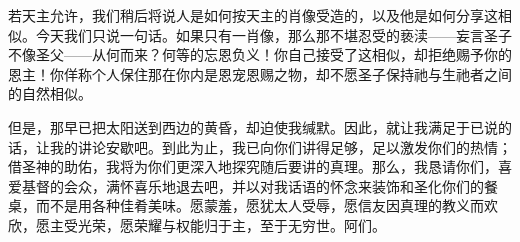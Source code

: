 若天主允许，我们稍后将说人是如何按天主的肖像受造的，以及他是如何分享这相似。今天我们只说一句话。如果只有一肖像，那么那不堪忍受的亵渎——妄言圣子不像圣父——从何而来？何等的忘恩负义！你自己接受了这相似，却拒绝赐予你的恩主！你佯称个人保住那在你内是恩宠恩赐之物，却不愿圣子保持祂与生祂者之间的自然相似。\par

但是，那早已把太阳送到西边的黄昏，却迫使我缄默。因此，就让我满足于已说的话，让我的讲论安歇吧。到此为止，我已向你们讲得足够，足以激发你们的热情；借圣神的助佑，我将为你们更深入地探究随后要讲的真理。那么，我恳请你们，喜爱基督的会众，满怀喜乐地退去吧，并以对我话语的怀念来装饰和圣化你们的餐桌，而不是用各种佳肴美味。愿蒙羞，愿犹太人受辱，愿信友因真理的教义而欢欣，愿主受光荣，愿荣耀与权能归于主，至于无穷世。阿们。\par

